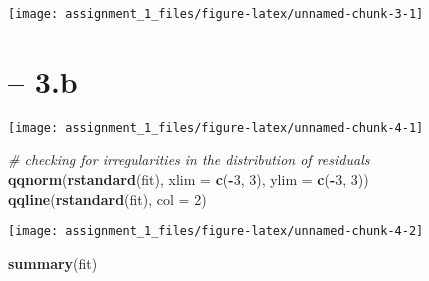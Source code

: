 \documentclass[
]{article}
\newenvironment{Shaded}{\begin{snugshade}}{\end{snugshade}}
\newcommand{\CommentTok}[1]{\textcolor[rgb]{0.56,0.35,0.01}{\textit{#1}}}
\newcommand{\DataTypeTok}[1]{\textcolor[rgb]{0.13,0.29,0.53}{#1}}
\newcommand{\DecValTok}[1]{\textcolor[rgb]{0.00,0.00,0.81}{#1}}
\newcommand{\KeywordTok}[1]{\textcolor[rgb]{0.13,0.29,0.53}{\textbf{#1}}}
\newcommand{\NormalTok}[1]{#1}
\newcommand{\OperatorTok}[1]{\textcolor[rgb]{0.81,0.36,0.00}{\textbf{#1}}}
\newcommand{\StringTok}[1]{\textcolor[rgb]{0.31,0.60,0.02}{#1}}
\begin{document}
\begin{center}\texttt{[image: assignment\_1\_files/figure-latex/unnamed-chunk-3-1]} \end{center}

\hypertarget{b}{%
\section{-- 3.b}\label{b}}

\begin{Shaded}
\end{Shaded}

\begin{center}\texttt{[image: assignment\_1\_files/figure-latex/unnamed-chunk-4-1]} \end{center}

\begin{Shaded}
\begin{Highlighting}[]
\CommentTok{# checking for irregularities in the distribution of residuals}
\KeywordTok{qqnorm}\NormalTok{(}\KeywordTok{rstandard}\NormalTok{(fit), }\DataTypeTok{xlim =} \KeywordTok{c}\NormalTok{(}\OperatorTok{-}\DecValTok{3}\NormalTok{, }\DecValTok{3}\NormalTok{), }\DataTypeTok{ylim =} \KeywordTok{c}\NormalTok{(}\OperatorTok{-}\DecValTok{3}\NormalTok{, }\DecValTok{3}\NormalTok{))}
\KeywordTok{qqline}\NormalTok{(}\KeywordTok{rstandard}\NormalTok{(fit), }\DataTypeTok{col =} \DecValTok{2}\NormalTok{)}
\end{Highlighting}
\end{Shaded}

\begin{center}\texttt{[image: assignment\_1\_files/figure-latex/unnamed-chunk-4-2]} \end{center}

\begin{Shaded}
\begin{Highlighting}[]
\KeywordTok{summary}\NormalTok{(fit)}
\end{Highlighting}
\end{Shaded}
\end{document}
